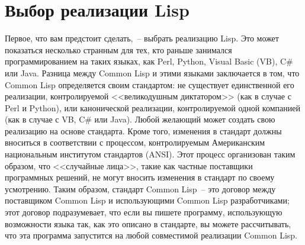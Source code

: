 \section{Выбор реализации Lisp}

Первое, что вам предстоит сделать,~-- выбрать реализацию Lisp. Это может показаться
несколько странным для тех, кто раньше занимался программированием на таких языках, как Perl,
Python, Visual Basic (VB), C\# или Java. Разница между Common Lisp и этими языками
заключается в том, что Common Lisp определяется своим стандартом: не существует
единственной его реализации, контро\-ли\-руе\-мой <<великодушным диктатором>> (как в случае с Perl
и Python), или канонической реализации, контролируемой одной компанией (как в случае с VB,
C\# или Java). Любой желающий может создать свою реализацию на основе стандарта. Кроме
того, изменения в стандарт должны вноситься в соответствии с процессом, контролируемым
Американским национальным институтом стандартов (ANSI). Этот процесс организован таким
образом, что <<случайные лица>>, такие как частные поставщики программных решений, не могут
вносить изменения в стандарт по своему усмотрению. Таким образом, стандарт Common Lisp~-- это договор между поставщиком Common
Lisp и использующими Common Lisp разработчиками; этот договор подразумевает, что если вы
пишете программу, использующую возможности языка так, как это описано в стандарте, вы
можете рассчитывать, что эта программа запустится на любой совместимой реализации Common
Lisp.

